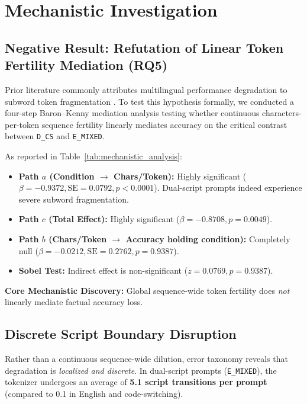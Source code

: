 \documentclass[11pt]{article}
\begin{document}
\section{Mechanistic Investigation}
\label{sec:mechanism}



\subsection{Negative Result: Refutation of Linear Token Fertility Mediation (RQ5)}
Prior literature commonly attributes multilingual performance degradation to subword token fragmentation \citep{rust2021good,petrov2023language}. To test this hypothesis formally, we conducted a four-step Baron--Kenny mediation analysis \citep{baron1986moderator} testing whether continuous characters-per-token sequence fertility linearly mediates accuracy on the critical contrast between \texttt{D\_CS} and \texttt{E\_MIXED}.

As reported in Table~\ref{tab:mechanistic_analysis}:
\begin{itemize}
    \item \textbf{Path $a$ (Condition $\to$ Chars/Token):} Highly significant ($\beta = -0.9372, \text{SE} = 0.0792, p < 0.0001$). Dual-script prompts indeed experience severe subword fragmentation.
    \item \textbf{Path $c$ (Total Effect):} Highly significant ($\beta = -0.8708, p = 0.0049$).
    \item \textbf{Path $b$ (Chars/Token $\to$ Accuracy holding condition):} Completely null ($\beta = -0.0212, \text{SE} = 0.2762, p = 0.9387$).
    \item \textbf{Sobel Test:} Indirect effect is non-significant ($z = 0.0769, p = 0.9387$).
\end{itemize}
\textbf{Core Mechanistic Discovery:} Global sequence-wide token fertility does \textit{not} linearly mediate factual accuracy loss.

\subsection{Discrete Script Boundary Disruption}
Rather than a continuous sequence-wide dilution, error taxonomy reveals that degradation is \textit{localized and discrete}. In dual-script prompts (\texttt{E\_MIXED}), the tokenizer undergoes an average of \textbf{5.1 script transitions per prompt} (compared to 0.1 in English and code-switching).
\end{document}
